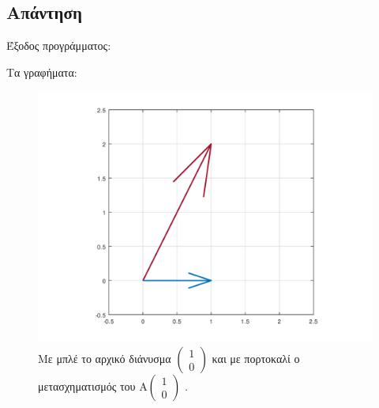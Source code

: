 \documentclass[a4paper,12pt]{article}
\begin{document}
\subsection{Απάντηση}
Έξοδος προγράμματος:

Τα γραφήματα:
\begin{figure}
    \centering
    \includegraphics[scale=0.7]{x1.png}
    \caption{Με μπλέ το αρχικό διάνυσμα
        $
            \begin{pmatrix}
                1 \\
                0
            \end{pmatrix}
        $
        και με πορτοκαλί ο μετασχηματισμός του
        $
            \text{A} \begin{pmatrix}
                1 \\
                0
            \end{pmatrix}
        $
        .}
\end{figure}
\end{document}
